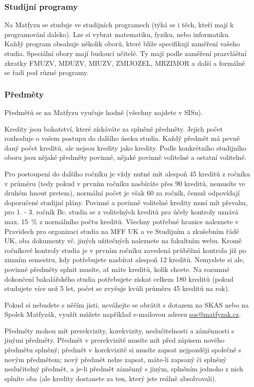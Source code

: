 \subsubsection{Studijní programy}
Na Matfyzu se studuje ve studijních programech (týká se i těch, kteří mají k
programování daleko). Lze si vybrat matematiku, fyziku, nebo informatiku. Každý
program obsahuje několik oborů, které blíže specifikují zaměření vašeho studia.
Speciální obory mají budoucí učitelé. Ty mají podle zaměření prazvláštní zkratky
FMUZV, MDUZV, MIUZV, ZMIJOZEL, MRZIMOR a další a formálně se řadí pod různé
programy.


\subsubsection{Předměty}
Předmětů se na Matfyzu vyučuje hodně (všechny najdete v SISu).

Kredity jsou bohatství, které získáváte za splněné předměty. Jejich počet
rozhoduje o vašem postupu do dalšího úseku studia. 
Každý předmět má pevně daný počet kreditů, ale nejsou kredity jako kredity.
Podle konkrétního studijního oboru jsou nějaké předměty povinné, nějaké povinně
volitelné a ostatní volitelné.

Pro postoupení do dalšího ročníku je vždy nutné mít alespoň 45 kreditů z ročníku
v průměru (tedy pokud v prvním ročníku nasbíráte přes 90 kreditů, nemusíte ve
druhém hnout prstem), normální počet je však 60 za ročník, čemuž odpovídají
doporučené studijní plány. Povinné a povinně volitelné kredity musí mít převahu,
pro 1. - 3. ročník Bc. studia se z volitelných kreditů pro účely kontroly uznává
max. 15~\% z normálního počtu kreditů. Všechny potřebné hranice naleznete v
Pravidech pro organizaci studia na MFF UK a ve Studijním a zkušebním řádě UK,
oba dokumenty vč. jiných užitečných naleznete na fakultním webu. Kromě ročníkové
kontroly studia je v prvním ročníku zavedená průběžná kontrola již po zimním
semestru, kdy potřebujete nasbírat alespoň 12 kreditů. Nemyslete si ale, povinné
předměty splnit musíte, ať máte kreditů, kolik chcete.
Na rozumné dokončení bakalářského studia potřebujete získat celkem 180 kreditů
(pokud studujete více než 5 let, počet se zvyšuje kvůli průměru 45 kreditů na
rok).

Pokud si nebudete s něčím jisti, neváhejte se obrátit s dotazem na SKAS nebo na
Spolek Matfyzák, využít můžete například e-mailovou adresu
\url{sos@matfyzak.cz}.

Předměty mohou mít prerekvizity, korekvizity, neslučitelnosti a záměnnosti s
jinými předměty.
Předmět v prerekvizitě musíte mít před zápisem nového předmětu splněný; předmět
v korekvizitě si musíte zapsat nejpozději společně s novým předmětem; nový
předmět nelze zapsat, máte-li zapsaný či splněný neslučitelný předmět, a je-li
předmět záměnný s jiným, splněním jednoho z nich splníte oba (ale kredity
dostanete za ten, který jste reálně absolvovali).

